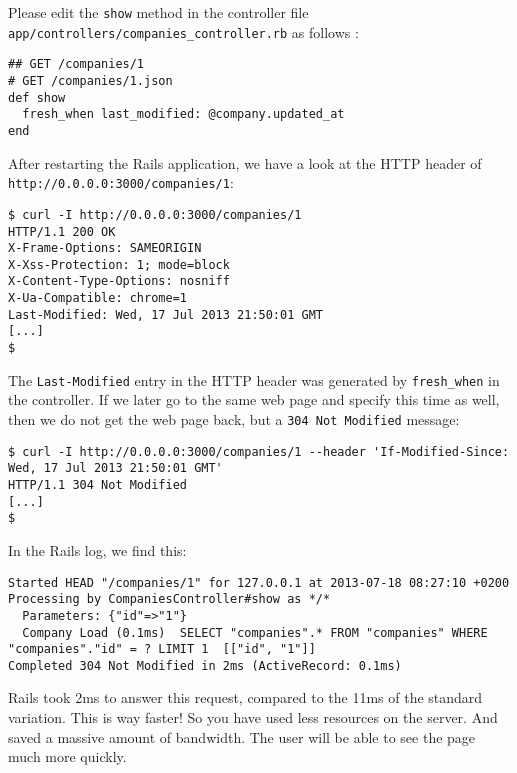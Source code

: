 \documentclass[a4paper]{book}
\begin{document}
Please edit the \texttt{show} method in the controller file \texttt{app/controllers/companies\_controller.rb} as follows :

\begin{shaded}\begin{verbatim}
## GET /companies/1
# GET /companies/1.json
def show
  fresh_when last_modified: @company.updated_at
end
\end{verbatim}\end{shaded}

After restarting the Rails application, we have a look at the HTTP header of \texttt{http://0.0.0.0:3000/companies/1}:

\begin{shaded}\begin{verbatim}
$ curl -I http://0.0.0.0:3000/companies/1
HTTP/1.1 200 OK
X-Frame-Options: SAMEORIGIN
X-Xss-Protection: 1; mode=block
X-Content-Type-Options: nosniff
X-Ua-Compatible: chrome=1
Last-Modified: Wed, 17 Jul 2013 21:50:01 GMT
[...]
$
\end{verbatim}\end{shaded}

The \texttt{Last-Modified} entry in the HTTP header was generated by \texttt{fresh\_when} in the controller. If we later go to the same web page and specify this time as well, then we do not get the web page back, but a \texttt{304 Not Modified} message:

\begin{shaded}\begin{verbatim}
$ curl -I http://0.0.0.0:3000/companies/1 --header 'If-Modified-Since: Wed, 17 Jul 2013 21:50:01 GMT'
HTTP/1.1 304 Not Modified
[...]
$
\end{verbatim}\end{shaded}

In the Rails log, we find this:

\begin{shaded}\begin{verbatim}
Started HEAD "/companies/1" for 127.0.0.1 at 2013-07-18 08:27:10 +0200
Processing by CompaniesController#show as */*
  Parameters: {"id"=>"1"}
  Company Load (0.1ms)  SELECT "companies".* FROM "companies" WHERE "companies"."id" = ? LIMIT 1  [["id", "1"]]
Completed 304 Not Modified in 2ms (ActiveRecord: 0.1ms)
\end{verbatim}\end{shaded}

Rails took 2ms to answer this request, compared to the 11ms of the standard variation. This is way faster! So you have used less resources on the server. And saved a massive amount of bandwidth. The user will be able to see the page much more quickly.
\end{document}
